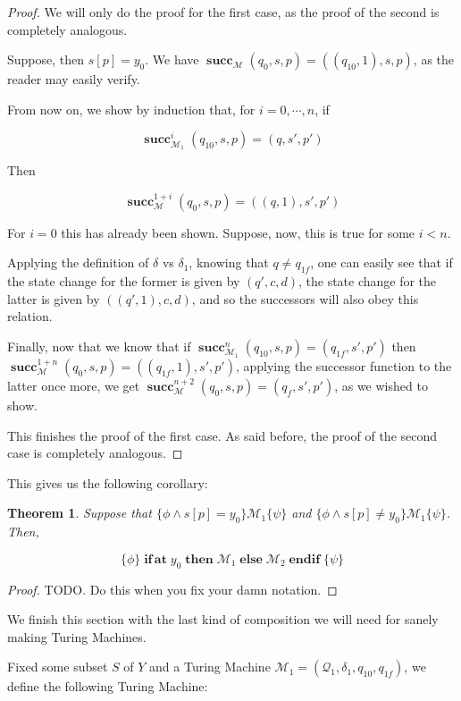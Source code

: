 \documentclass{article}
\newtheorem{theorem}{Theorem}
\newcommand{\M}{\mathcal{M}}
\newcommand{\Q}{\mathcal{Q}}
\DeclareMathOperator{\suc}{\mathbf{succ}}
\DeclareMathOperator{\Nifat}{\mathbf{if\,at}}
\DeclareMathOperator{\Nthen}{\mathbf{then}}
\DeclareMathOperator{\Nelse}{\mathbf{else}}
\DeclareMathOperator{\Nendif}{\mathbf{endif}}
\begin{document}
	\begin{proof}
	We will only do the proof for the first case, as the proof of the second is completely analogous.
	
	Suppose, then $s[p] = y_0$. We have $\suc_\M (q_0, s, p) = ((q_{10}, 1), s, p)$, as the reader may easily verify.
	
	From now on, we show by induction that, for $i = 0, \cdots, n$, if
	
	\[\suc^i_{\M_1} (q_{10}, s, p) = (q, s', p')\]
	
	Then
	
	\[\suc^{1+i}_\M (q_0, s, p) = ((q, 1), s', p')\]
	
	For $i = 0$ this has already been shown. Suppose, now, this is true for some $i < n$.
	
	Applying the definition of $\delta$ vs $\delta_1$, knowing that $q \neq q_{1f}$, one can easily see that if the state change for the former is given by $(q', c, d)$, the state change for the latter is given by $((q', 1), c, d)$, and so the successors will also obey this relation.
	
	Finally, now that we know that if $\suc^n_{\M_1} (q_{10}, s, p) = (q_{1f}, s', p')$ then $\suc^{1+n}_\M (q_0, s, p) = ((q_{1f}, 1), s', p')$, applying the successor function to the latter once more, we get $\suc^{n+2}_\M (q_0, s, p) = (q_f, s', p')$, as we wished to show.
	
	This finishes the proof of the first case. As said before, the proof of the second case is completely analogous.
	\end{proof}
	
	This gives us the following corollary:
	
	\begin{theorem}
	Suppose that $\{\phi \land s[p] = y_0\} \M_1 \{\psi\}$ and $\{\phi \land s[p] \neq y_0\} \M_1 \{\psi\}$. Then,
	
	\[\{\phi\} \Nifat y_0 \Nthen \M_1 \Nelse \M_2 \Nendif \{\psi\}\]
	\end{theorem}
	
	\begin{proof}
	TODO. Do this when you fix your damn notation.
	\end{proof}
	
	We finish this section with the last kind of composition we will need for sanely making Turing Machines.

	Fixed some subset $S$ of $Y$ and a Turing Machine $\M_1 = (\Q_1, \delta_1, q_{10}, q_{1f})$, we define the following Turing Machine:
	
\end{document}
